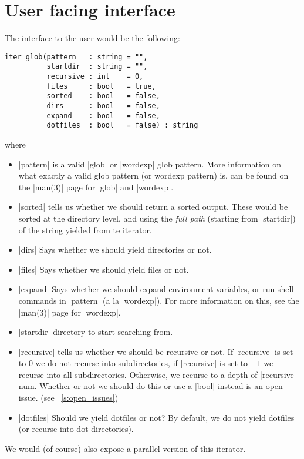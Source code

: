 \documentclass{article}
\begin{document}
\section{User facing interface}
The interface to the user would be the following:
\begin{lstlisting}
iter glob(pattern   : string = "",
          startdir  : string = "",
          recursive : int    = 0,
          files     : bool   = true,
          sorted    : bool   = false,
          dirs      : bool   = false,
          expand    : bool   = false,
          dotfiles  : bool   = false) : string
\end{lstlisting}
where
\begin{itemize}
\item |pattern| is a valid |glob| or |wordexp| glob pattern. More information on what
exactly a valid glob pattern (or wordexp pattern) is, can be found on the |man(3)|
page for |glob| and |wordexp|.
\item |sorted| tells us whether we should return a sorted output. These would be
sorted at the directory level, and using the \emph{full path} (starting from
|startdir|) of the string yielded from te iterator.
\item |dirs| Says whether we should yield directories or not.
\item |files| Says whether we should yield files or not.
\item |expand| Says whether we should expand environment variables, or run shell
commands in |pattern| (a la |wordexp|). For more information on this, see the
|man(3)| page for |wordexp|.
\item |startdir| directory to start searching from.
\item |recursive| tells us whether we should be recursive or not. If |recursive| is
set to $0$ we do not recurse into subdirectories, if |recursive| is set to $-1$ we
recurse into all subdirectories. Otherwise, we recurse to a depth of |recursive| num.
Whether or not we should do this or use a |bool| instead is an open
issue. (see ~\ref{s:open_issues})
\item |dotfiles| Should we yield dotfiles or not? By default, we do not yield
dotfiles (or recurse into dot directories).
\end{itemize}

We would (of course) also expose a parallel version of this iterator.
\end{document}
